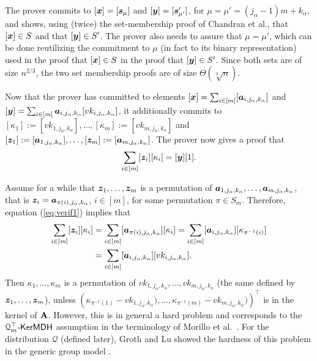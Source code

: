 The prover commits to $[{\boldsymbol{x}}]=[{\boldsymbol{s}}_\mu]$ and $[{\boldsymbol{y}}]=[{\boldsymbol{s}}'_{\mu'}]$, for $\mu=\mu'=(j_\alpha-1)m+k_\alpha$, and shows, using (twice) the set-membership proof of Chandran et al., that $[{\boldsymbol{x}}]\in S$ and that $[{\boldsymbol{y}}]\in S'$.
The prover also needs to assure that $\mu=\mu'$, which can be done reutilizing the commitment to $\mu$ (in fact to its binary representation) used in the proof that $[{\boldsymbol{x}}]\in S$ in the proof that $[{\boldsymbol{y}}]\in S'$. Since both sets are of size $n^{2/3}$, the two set membership proofs are of size $\Theta(\sqrt[3]{n})$.
 
Now that the prover has committed to elements $[{\boldsymbol{x}}]=\sum_{i\in[m]}[{\boldsymbol{a}}_{i,j_\alpha,k_\alpha}]$ and $[{\boldsymbol{y}}]=\sum_{i\in[m]}{\boldsymbol{a}}_{i,j_\alpha,k_\alpha}[vk_{i,j_\alpha,k_\alpha}]$, it additionally commits to $[\kappa_1]:=[vk_{1,j_\alpha,k_\alpha}],\allowbreak\ldots,\allowbreak[\kappa_m]:=[vk_{m,j_\alpha,k_\alpha}]$ and $[{\boldsymbol{z}}_1]:=[{\boldsymbol{a}}_{1,j_\alpha,k_\alpha}],\ldots,[{\boldsymbol{z}}_m]:=[{\boldsymbol{a}}_{m,j_\alpha,k_\alpha}]$. The prover now gives a proof that
\begin{equation}
\sum_{i\in[m]}[{\boldsymbol{z}}_i][\kappa_i]=[{\boldsymbol{y}}][1]. \label{eq:verif1}
\end{equation}

Assume for a while that ${\boldsymbol{z}}_1,\ldots,{\boldsymbol{z}}_m$ is a permutation of ${\boldsymbol{a}}_{1,j_\alpha,k_\alpha},\ldots,{\boldsymbol{a}}_{m,j_\alpha,k_\alpha}$, that is ${\boldsymbol{z}}_i={\boldsymbol{a}}_{\pi(i),j_\alpha,k_\alpha}$, $i\in[m]$, for some permutation $\pi\in S_m$. Therefore, equation (\ref{eq:verif1}) implies that
\begin{align*}
\sum_{i\in[m]}[{\boldsymbol{z}}_i][\kappa_i]&=\sum_{i\in[m]}[{\boldsymbol{a}}_{\pi(i),j_\alpha,k_\alpha}][\kappa_i]=\sum_{i\in[m]}[{\boldsymbol{a}}_{i,j_\alpha,k_\alpha}][\kappa_{\pi^{-1}(i)}]\\
&=\sum_{i\in[m]}[{\boldsymbol{a}}_{i,j_\alpha,k_\alpha}][vk_{i,j_\alpha,k_\alpha}].
\end{align*}
Then $\kappa_1,\ldots,\kappa_m$ is a permutation of $vk_{1,j_\alpha,k_\alpha},\ldots,vk_{m,j_\alpha,k_\alpha}$ (the same defined by ${\boldsymbol{z}}_1,\ldots,{\boldsymbol{z}}_m$), unless $(\kappa_{\pi^{-1}(1)}-{vk_{1,j_\alpha,k_\alpha}),\ldots,\kappa_{\pi^{-1}(m)}-vk_{m,j_\alpha,k_\alpha})})^\top$ is in the kernel of $\mathbf{{A}}$. However, this is in general a hard problem and corresponds to the $\mathcal{Q}_m^\top\mbox{-}\mathsf{KerMDH}$ assumption in the terminology of Morillo et al.~\cite{AC:MorRafVil16}.
For the distribution $\mathcal{Q}$ (defined later), Groth and Lu showed the hardness of this problem in the generic group model \cite{AC:GroLu07}.

